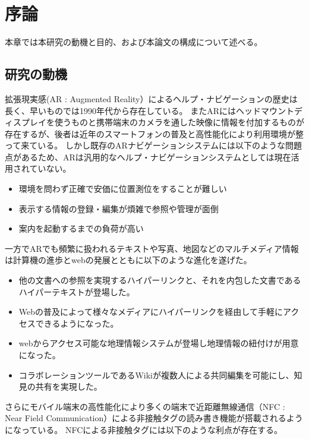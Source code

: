 \chapter{序論}
\label{chap:introduction}


本章では本研究の動機と目的、および本論文の構成について述べる。

\newpage


\section{研究の動機}
\label{motive}

拡張現実感(AR : Augmented Reality）によるヘルプ・ナビゲーションの歴史は長く、早いものでは1990年代から存在している。
またARにはヘッドマウントディスプレイを使うものと携帯端末のカメラを通した映像に情報を付加するものが存在するが、後者は近年のスマートフォンの普及と高性能化により利用環境が整って来ている。
しかし既存のARナビゲーションシステムには以下のような問題点があるため、ARは汎用的なヘルプ・ナビゲーションシステムとしては現在活用されていない。

\begin{itemize}
  \item 環境を問わず正確で安価に位置測位をすることが難しい
  \item 表示する情報の登録・編集が煩雑で参照や管理が面倒
  \item 案内を起動するまでの負荷が高い
\end{itemize}

一方でARでも頻繁に扱われるテキストや写真、地図などのマルチメディア情報は計算機の進歩とwebの発展とともに以下のような進化を遂げた。

\begin{itemize}
  \item 他の文書への参照を実現するハイパーリンクと、それを内包した文書であるハイパーテキストが登場した。
  \item Webの普及によって様々なメディアにハイパーリンクを経由して手軽にアクセスできるようになった。
  \item webからアクセス可能な地理情報システムが登場し地理情報の紐付けが用意になった。
  \item コラボレーションツールであるWikiが複数人による共同編集を可能にし、知見の共有を実現した。
\end{itemize}

さらにモバイル端末の高性能化により多くの端末で近距離無線通信（NFC : Near Field Communication）による非接触タグの読み書き機能が搭載されるようになっている。
NFCによる非接触タグには以下のような利点が存在する。


